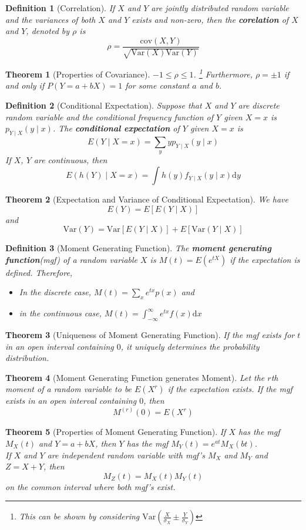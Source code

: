 \documentclass[12pt]{article}
\newcommand{\diff}{\mathrm{d}}
\newcommand{\var}{\mathrm{Var}}
\newcommand{\cov}{\mathrm{cov}}
\newtheorem{definition}{Definition}[section]
\newtheorem{theorem}{Theorem}[section]
\theoremstyle{definition}
\begin{document}
\begin{definition}[Correlation]
\normalfont If $X$ and $Y$ are jointly distributed random variable and the variances of both $X$ and $Y$ exists and non-zero, then the \textbf{corelation} of $X$ and $Y$, denoted by $\rho$  is
\[
\rho = \frac{\cov(X,Y)}{\sqrt{\var(X)\var(Y)}}
\]
\end{definition}
\begin{theorem}[Properties of Covariance]
\normalfont $-1\leq \rho\leq 1$. \footnote{This can be shown by considering $\var(\frac{X}{\sigma_X}\pm \frac{Y}{\sigma_Y})$} Furthermore, $\rho = \pm 1$ if and only if $P(Y=a+bX)=1$ for some constant $a$ and $b$.
\end{theorem}
\begin{definition}[Conditional Expectation]
\normalfont Suppose that $X$ and $Y$ are discrete random variable and the conditional frequency function of $Y$ given $X=x$ is $p_{Y\mid X}(y\mid x)$. The \textbf{conditional expectation} of $Y$ given $X=x$ is
\[
E(Y\mid X=x) = \sum_y y p_{Y\mid X}(y\mid x)
\]
If $X$, $Y$ are continuous, then
\[
E(h(Y)\mid X=x) = \int h(y) f_{Y\mid X}(y\mid x)\diff y
\]
\end{definition}
\begin{theorem}[Expectation and Variance of Conditional Expectation]
\normalfont We have
\[
E(Y) = E[E(Y\mid X)]
\]
and
\[
\var(Y) = \var[E(Y\mid X)] + E[\var(Y\mid X)]
\]
\end{theorem}
\begin{definition}[Moment Generating Function]
\normalfont The \textbf{moment generating function}(mgf) of a random variable $X$ is $M(t) = E(e^{tX})$ if the expectation is defined. Therefore,
\begin{itemize}
  \item In the discrete case, $M(t) = \sum_x e^{tx}p(x)$ and 
  \item in the continuous case, $M(t) = \int_{-\infty}^\infty e^{tx}f(x)\diff x$
\end{itemize}
\end{definition}
\begin{theorem}[Uniqueness of Moment Generating Function]
\normalfont If the mgf exists for $t$ in an open interval containing $0$, it uniquely determines the probability distribution.
\end{theorem}
\begin{theorem}[Moment Generating Function generates Moment]
\normalfont Let the $r$th moment of a random variable to be $E(X^r)$ if the expectation exists. If the mgf exists in an open interval containing $0$, then 
\[
M^{(r)}(0) = E(X^r)
\]
\end{theorem}
\begin{theorem}[Properties of Moment Generating Function]
\normalfont If $X$ has the mgf $M_X(t)$ and $Y=a+bX$, then $Y$ has the mgf $M_Y(t) = e^{at}M_X(bt)$.\\

If $X$ and $Y$ are independent random variable with mgf's $M_X$ and $M_Y$ and $Z=X+Y$, then
\[
M_Z(t) = M_X(t)M_Y(t)
\]
on the common interval where both mgf's exist.
\end{theorem}
\end{document}
